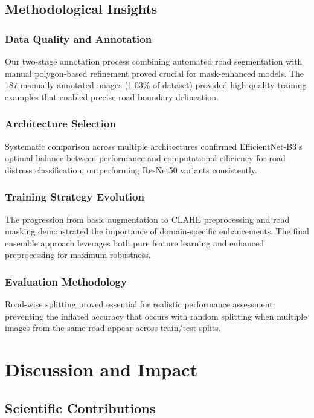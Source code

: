 \documentclass[12pt]{article}
\begin{document}
\subsection{Methodological Insights}

\subsubsection{Data Quality and Annotation}

Our two-stage annotation process combining automated road segmentation with manual polygon-based refinement proved crucial for mask-enhanced models. The 187 manually annotated images (1.03\% of dataset) provided high-quality training examples that enabled precise road boundary delineation.

\subsubsection{Architecture Selection}

Systematic comparison across multiple architectures confirmed EfficientNet-B3's optimal balance between performance and computational efficiency for road distress classification, outperforming ResNet50 variants consistently.

\subsubsection{Training Strategy Evolution}

The progression from basic augmentation to CLAHE preprocessing and road masking demonstrated the importance of domain-specific enhancements. The final ensemble approach leverages both pure feature learning and enhanced preprocessing for maximum robustness.

\subsubsection{Evaluation Methodology}

Road-wise splitting proved essential for realistic performance assessment, preventing the inflated accuracy that occurs with random splitting when multiple images from the same road appear across train/test splits.

\section{Discussion and Impact}

\subsection{Scientific Contributions}
\end{document}
